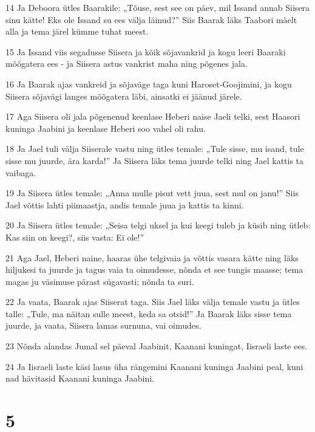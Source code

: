\par 14 Ja Deboora ütles Baarakile: „Tõuse, sest see on päev, mil Issand annab Siisera sinu kätte! Eks ole Issand su ees välja läinud?” Siis Baarak läks Taabori mäelt alla ja tema järel kümme tuhat meest.
\par 15 Ja Issand viis segadusse Siisera ja kõik sõjavankrid ja kogu leeri Baaraki mõõgatera ees - ja Siisera astus vankrist maha ning põgenes jala.
\par 16 Ja Baarak ajas vankreid ja sõjaväge taga kuni Haroset-Goojimini, ja kogu Siisera sõjavägi langes mõõgatera läbi, ainsatki ei jäänud järele.
\par 17 Aga Siisera oli jala põgenenud keenlase Heberi naise Jaeli telki, sest Haasori kuninga Jaabini ja keenlase Heberi soo vahel oli rahu.
\par 18 Ja Jael tuli välja Siiserale vastu ning ütles temale: „Tule sisse, mu isand, tule sisse mu juurde, ära karda!” Ja Siisera läks tema juurde telki ning Jael kattis ta vaibaga.
\par 19 Ja Siisera ütles temale: „Anna mulle pisut vett juua, sest mul on janu!” Siis Jael võttis lahti piimaastja, andis temale juua ja kattis ta kinni.
\par 20 Ja Siisera ütles temale: „Seisa telgi uksel ja kui keegi tuleb ja küsib ning ütleb: Kas siin on keegi?, siis vasta: Ei ole!”
\par 21 Aga Jael, Heberi naine, haaras ühe telgivaia ja võttis vasara kätte ning läks hiljukesi ta juurde ja tagus vaia ta oimudesse, nõnda et see tungis maasse; tema magas ju väsimuse pärast sügavasti; nõnda ta suri.
\par 22 Ja vaata, Baarak ajas Siiserat taga. Siis Jael läks välja temale vastu ja ütles talle: „Tule, ma näitan sulle meest, keda sa otsid!” Ja Baarak läks sisse tema juurde, ja vaata, Siisera lamas surnuna, vai oimudes.
\par 23 Nõnda alandas Jumal sel päeval Jaabinit, Kaanani kuningat, Iisraeli laste ees.
\par 24 Ja Iisraeli laste käsi lasus üha rängemini Kaanani kuninga Jaabini peal, kuni nad hävitasid Kaanani kuninga Jaabini.

\chapter{5}

